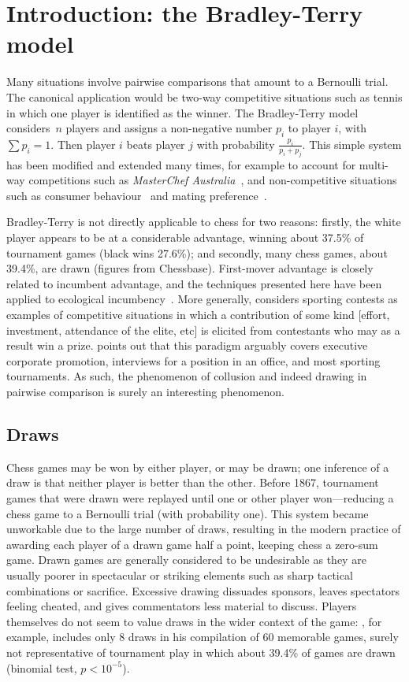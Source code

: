 \documentclass[review]{elsarticle}
\begin{document}
\section{Introduction: the Bradley-Terry model}

Many situations involve pairwise comparisons that amount to a
Bernoulli trial.  The canonical application would be two-way
competitive situations such as tennis in which one player is
identified as the winner.  The Bradley-Terry
model~\citep{bradley1952,turner2012} considers~$n$ players and assigns
a non-negative number $p_i$ to player $i$, with $\sum p_i=1$.  Then
player $i$ beats player $j$ with probability $\frac{p_i}{p_i+p_j}$.
This simple system has been modified and extended many times, for
example to account for multi-way competitions such as {\em MasterChef
  Australia}~\citep{hankin2017}, and non-competitive situations such
as consumer behaviour~\citep{hankin2010} and mating
preference~\citep{west2008}.

Bradley-Terry is not directly applicable to chess for two reasons:
firstly, the white player appears to be at a considerable advantage,
winning about 37.5\% of tournament games (black wins 27.6\%); and
secondly, many chess games, about 39.4\%, are drawn (figures from
Chessbase).  First-mover advantage is closely
  related to incumbent advantage, and the techniques presented here
  have been applied to ecological incumbency~\citep{hankin2010}.  More
  generally, \cite{szymanski2003} considers sporting contests as
  examples of competitive situations in which a contribution of some
  kind [effort, investment, attendance of the elite, etc] is elicited
  from contestants who may as a result win a prize.
  \citeauthor{szymanski2003} points out that this paradigm arguably
  covers executive corporate promotion, interviews for a position in
  an office, and most sporting tournaments.  As such, the phenomenon
  of collusion and indeed drawing in pairwise comparison is surely an
  interesting phenomenon.
  
\subsection{Draws} Chess games may be won by either player, or may be
drawn; one inference of a draw is that neither player is better than
the other.  Before 1867, tournament games that were drawn were
replayed until one or other player won---reducing a chess game to a
Bernoulli trial (with probability one).  This system became unworkable
due to the large number of draws, resulting in the modern practice of
awarding each player of a drawn game half a point, keeping chess a
zero-sum game.  Drawn games are generally considered to be undesirable
as they are usually poorer in spectacular or striking elements such as
sharp tactical combinations or sacrifice.  Excessive drawing dissuades
sponsors, leaves spectators feeling cheated, and gives commentators
less material to discuss.  Players themselves do not seem to value
draws in the wider context of the game: \citet{fischer1969},
for example, includes only 8 draws in his compilation of 60 memorable
games, surely not representative of tournament play in which about
39.4\% of games are drawn (binomial test, $p<10^{-5}$).
\end{document}

